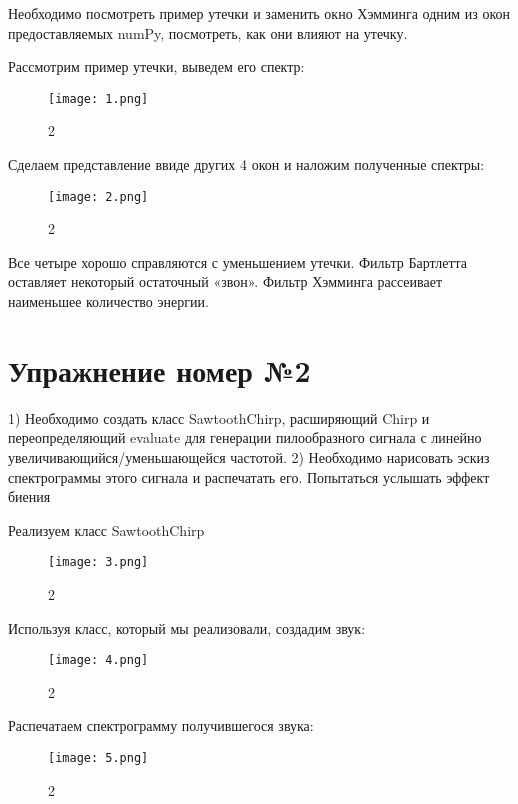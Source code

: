 \documentclass[10pt,a4paper,oneside]{article}
\begin{document}
Необходимо посмотреть пример утечки и заменить окно Хэмминга одним из окон предоставляемых numPy, посмотреть, как они влияют на утечку. 

Рассмотрим пример утечки, выведем его спектр: 

\begin{figure}[H]
        \centering
        \texttt{[image: 1.png]}
        \caption{2}
        \label{fig:first}
\end{figure}

Сделаем представление ввиде других 4 окон и наложим полученные спектры: 

\begin{figure}[H]
        \centering
        \texttt{[image: 2.png]}
        \caption{2}
        \label{fig:first}
\end{figure}

Все четыре хорошо справляются с уменьшением утечки. Фильтр Бартлетта оставляет некоторый остаточный «звон». Фильтр Хэмминга рассеивает наименьшее количество энергии.

\section{Упражнение номер №2}

1) Необходимо создать класс SawtoothChirp, расширяющий Chirp и переопределяющий evaluate для генерации пилообразного сигнала с линейно увеличивающийся/уменьшающейся частотой.
2) Необходимо нарисовать эскиз спектрограммы этого сигнала и распечатать его. Попытаться услышать эффект биения

Реализуем класс SawtoothChirp

\begin{figure}[H]
        \centering
        \texttt{[image: 3.png]}
        \caption{2}
        \label{fig:first}
\end{figure}

Используя класс, который мы реализовали, создадим звук: 

\begin{figure}[H]
        \centering
        \texttt{[image: 4.png]}
        \caption{2}
        \label{fig:first}
\end{figure}

Распечатаем спектрограмму получившегося звука: 

\begin{figure}[H]
        \centering
        \texttt{[image: 5.png]}
        \caption{2}
        \label{fig:first}
\end{figure}
\end{document}
